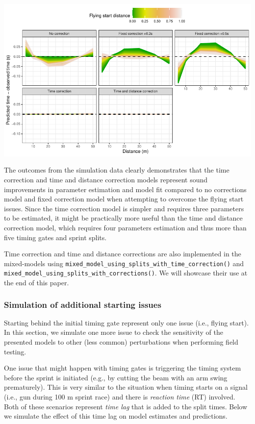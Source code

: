 \documentclass[fleqn,10pt,lineno]{wlpeerj} %
\begin{document}
\begin{center}\includegraphics[width=1\linewidth]{paper_files/figure-latex/unnamed-chunk-47-1} \end{center}

The outcomes from the simulation data clearly demonstrates that the time correction and time and distance correction models represent sound improvements in parameter estimation and model fit compared to no corrections model and fixed correction model when attempting to overcome the flying start issues. Since the time correction model is simpler and requires three parameters to be estimated, it might be practically more useful than the time and distance correction model, which requires four parameters estimation and thus more than five timing gates and sprint splits.

Time correction and time and distance corrections are also implemented in the mixed-models using \texttt{mixed\_model\_using\_splits\_with\_time\_correction()} and \texttt{mixed\_model\_using\_splits\_with\_corrections()}. We will showcase their use at the end of this paper.

\hypertarget{simulation-of-additional-starting-issues}{%
\subsubsection{Simulation of additional starting issues}\label{simulation-of-additional-starting-issues}}

Starting behind the initial timing gate represent only one issue (i.e., flying start). In this section, we simulate one more issue to check the sensitivity of the presented models to other (less common) perturbations when performing field testing.

One issue that might happen with timing gates is triggering the timing system before the sprint is initiated (e.g., by cutting the beam with an arm swing prematurely). This is very similar to the situation when timing starts on a signal (i.e., gun during 100 m sprint race) and there is \emph{reaction time} (RT) involved. Both of these scenarios represent \emph{time lag} that is added to the split times. Below we simulate the effect of this time lag on model estimates and predictions.
\end{document}
